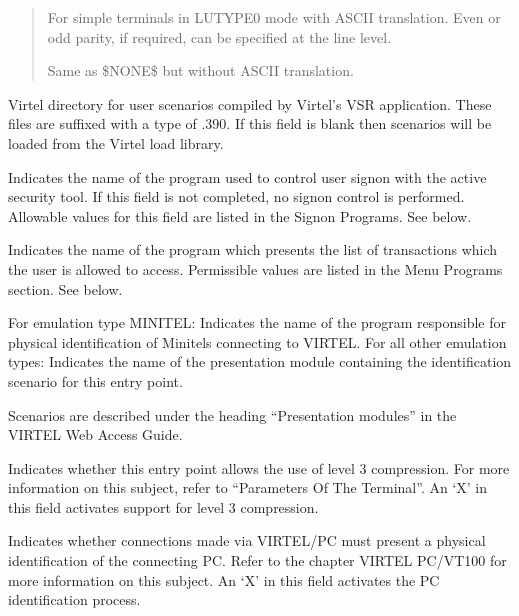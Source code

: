 \documentclass[letterpaper,10pt,english]{sphinxmanual}
\begin{document}
\begin{description}
\begin{quote}
\begin{description}
\sphinxAtStartPar
For simple terminals in LUTYPE0 mode with ASCII translation. Even or odd parity, if required, can be specified at the line level.

\sphinxAtStartPar
Same as \$NONE\$ but without ASCII translation.

\end{description}
\end{quote}

\sphinxAtStartPar
Virtel directory for user scenarios compiled by Virtel’s VSR application. These files are suffixed with a type of .390. If this field is blank then scenarios will be loaded from the Virtel load library.

\sphinxAtStartPar
Indicates the name of the program used to control user sign\sphinxhyphen{}on with the active security tool. If this field is not completed, no sign\sphinxhyphen{}on control is performed. Allowable values for this field are listed in the Signon Programs. See below.

\sphinxAtStartPar
Indicates the name of the program which presents the list of transactions which the user is allowed to access. Permissible values are listed in the Menu Programs section. See below.

\sphinxAtStartPar
For emulation type MINITEL: Indicates the name of the program responsible for physical identification of Minitels connecting to VIRTEL. For all other emulation types: Indicates the name of the presentation module containing the identification scenario for this entry point.

\sphinxAtStartPar
Scenarios are described under the heading “Presentation modules” in the VIRTEL Web Access Guide.

\sphinxAtStartPar
Indicates whether this entry point allows the use of level 3 compression. For more information on this subject, refer to “Parameters Of The Terminal”. An ‘X’ in this field activates support for level 3 compression.

\sphinxAtStartPar
Indicates whether connections made via VIRTEL/PC must present a physical identification of the connecting PC. Refer to the chapter VIRTEL PC/VT100 for more information on this subject. An ‘X’ in this field activates the PC identification process.


\end{description}
\end{document}
